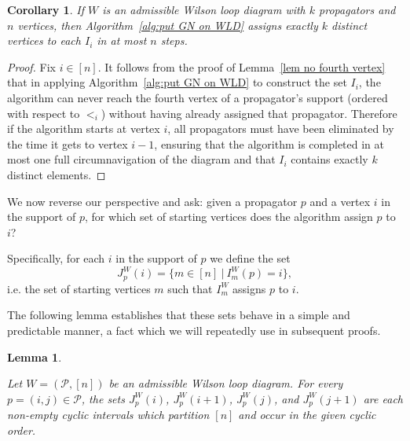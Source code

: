 \documentclass[11pt]{article}
\newcommand{\cP}{\mathcal{P}}
\newtheorem{lem}[thm]{Lemma}
\newtheorem{cor}[thm]{Corollary}
\theoremstyle{remark}
\theoremstyle{definition}
\begin{document}
\begin{cor}\label{GN alg well defined}
If $W$ is an admissible Wilson loop diagram with $k$ propagators and $n$ vertices, then Algorithm~\ref{alg:put GN on WLD} assigns exactly $k$ distinct vertices to each $I_i$ in at most $n$ steps.
\end{cor} 
\begin{proof}
Fix $i \in [n]$. It follows from the proof of Lemma~\ref{lem no fourth vertex} that in applying Algorithm~\ref{alg:put GN on WLD} to construct the set $I_i$, the algorithm can never reach the fourth vertex of a propagator's support (ordered with respect to $<_i$) without having already assigned that propagator. Therefore if the algorithm starts at vertex $i$, all propagators must have been eliminated by the time it gets to vertex $i-1$, ensuring that the algorithm is completed in at most one full circumnavigation of the diagram and that $I_i$ contains exactly $k$ distinct elements.
\end{proof}

We now reverse our perspective and ask: given a propagator $p$ and a vertex $i$ in the support of $p$, for which set of starting vertices does the algorithm assign $p$ to $i$? 






Specifically, for each $i$ in the support of $p$ we define the set
\[J_p^{W}(i) = \{m \in [n] \ | \ I^{W}_m(p) = i \},\]
i.e. the set of starting vertices $m$ such that $I_m^{W}$ assigns $p$ to $i$. 

The following lemma establishes that these sets behave in a simple and predictable manner, a fact which we will repeatedly use in subsequent proofs.

\begingroup
\allowdisplaybreaks

\begin{lem} \label{vertex cyclic int lem}
  
Let $W = (\cP,[n])$ be an admissible Wilson loop diagram.  For every $p = (i,j) \in \cP$, the sets $J_p^{W}(i)$, $J_p^{W}(i+1)$, $J_p^{W}(j)$, and $J_p^{W}(j+1)$ are each non-empty cyclic intervals which partition $[n]$ and occur in the given cyclic order.
\end{lem}
\end{document}
